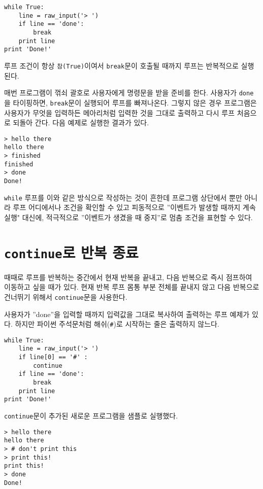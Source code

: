 \beforeverb
\begin{verbatim}
while True:
    line = raw_input('> ')
    if line == 'done':
        break
    print line
print 'Done!'
\end{verbatim}
\afterverb
%

루프 조건이 항상 {\tt 참(True)}이여서 {\tt break}문이 호출될 때까지 루프는 반복적으로 실행된다.

매번 프로그램이 꺾쇠 괄호로 사용자에게 명령문을 받을 준비를 한다.
사용자가 {\tt done}을 타이핑하면, {\tt break}문이 실행되어 루프를 빠져나온다. 
그렇지 않은 경우 프로그램은 사용자가 무엇을 입력하든 메아리처럼 입력한 것을 그대로 출력하고
다시 루프 처음으로 되돌아 간다. 다음 예제로 실행한 결과가 있다.

\beforeverb
\begin{verbatim}
> hello there
hello there
> finished
finished
> done
Done!
\end{verbatim}
\afterverb
%

{\tt while} 루프를 이와 같은 방식으로 작성하는 것이 흔한데 
프로그램 상단에서 뿐만 아니라 루프 어디에서나 조건을 확인할 수 있고 피동적으로 ''이벤트가 발생할 때까지 계속 실행" 대신에, 
적극적으로 ''이벤트가 생겼을 때 중지''로 멈춤 조건을 표현할 수 있다.

\section{  {\tt continue}로 반복 종료}

때때로 루프를 반복하는 중간에서 현재 반복을 끝내고, 다음 반복으로 즉시 점프하여 이동하고 싶을 때가 있다.
현재 반복 루프 몸통 부분 전체를 끝내지 않고 다음 반복으로 건너뛰기 위해서 {\tt continue}문을 사용한다.

사용자가 ''done''을 입력할 때까지 입력값을 그대로 복사하여 출력하는 루프 예제가 있다. 
하지만 파이썬 주석문처럼 해쉬(\verb"#")로 시작하는 줄은 출력하지 않느다.

\beforeverb
\begin{verbatim}
while True:
    line = raw_input('> ')
    if line[0] == '#' :
        continue
    if line == 'done':
        break
    print line
print 'Done!'
\end{verbatim}
\afterverb
%

{\tt continue}문이 추가된 새로운 프로그램을 샘플로 실행했다.

\beforeverb
\begin{verbatim}
> hello there
hello there
> # don't print this
> print this!
print this!
> done
Done!
\end{verbatim}
\afterverb
%

